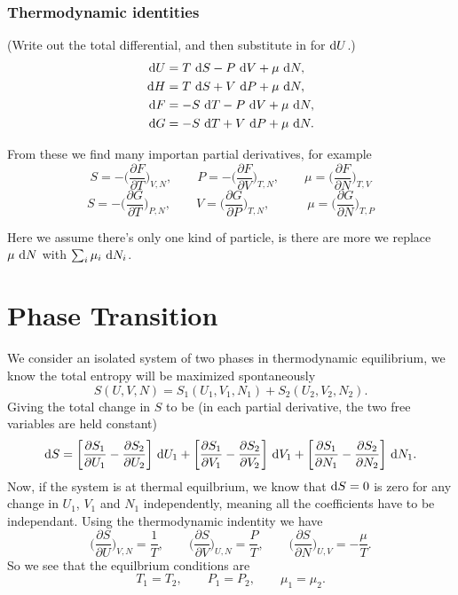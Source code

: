\documentclass[a4paper, 11pt, notitlepage, english]{article}
\renewcommand{\d}{{\rm d}}
\newcommand{\p}{\partial}
\begin{document}
\newpage

\subsubsection*{Thermodynamic identities}
(Write out the total differential, and then substitute in for $\d U$.)
\begin{align*}
\d U &= T\ \d S - P \ \d V + \mu \ \d N, \\
\d H &= T \ \d S + V\ \d P + \mu \ \d N, \\
\d F &=  - S \ \d T - P \ \d V + \mu \ \d N, \\
\d G &= -S \ \d T + V\ \d P + \mu \ \d N.
\end{align*}

From these we find many importan partial derivatives, for example
$$S = -\bigg(\frac{\p F}{\p T}\bigg)_{V, N}, \qquad P = -\bigg(\frac{\p F}{\p V}\bigg)_{T, N}, \qquad \mu = \bigg(\frac{\p F}{\p N}\bigg)_{T,V}$$
$$S = -\bigg(\frac{\p G}{\p T}\bigg)_{P, N}, \qquad V = \bigg(\frac{\p G}{\p P}\bigg)_{T, N}, \qquad\quad \mu = \bigg(\frac{\p G}{\p N}\bigg)_{T,P}$$

Here we assume there's only one kind of particle, is there are more we replace $\mu \ \d N$ with $\sum_i \mu_i \ \d N_i$.


\section{Phase Transition}

We consider an isolated system of two phases in thermodynamic equilibrium, we know the total entropy will be maximized spontaneously
$$S(U,V,N) = S_1(U_1,V_1,N_1) + S_2(U_2,V_2,N_2).$$
Giving the total change in $S$ to be (in each partial derivative, the two free variables are held constant)
$$\d S = \bigg[\frac{\p S_1}{\p U_1} - \frac{\p S_2}{\p U_2}\bigg]\ \d U_1 + \bigg[\frac{\p S_1}{\p V_1} - \frac{\p S_2}{\p V_2}\bigg]\ \d V_1 + \bigg[\frac{\p S_1}{\p N_1} - \frac{\p S_2}{\p N_2}\bigg]\ \d N_1.$$
Now, if the system is at thermal equilbrium, we know that $\d S = 0$ is zero for any change in $U_1$, $V_1$ and $N_1$ independently, meaning all the coefficients have to be independant. Using the thermodynamic indentity we have
$$\bigg(\frac{\p S}{\p U}\bigg)_{V, N} = \frac{1}{T}, \qquad \bigg(\frac{\p S}{\p V}\bigg)_{U, N} = \frac{P}{T}, \qquad \bigg(\frac{\p S}{\p N}\bigg)_{U, V} = -\frac{\mu}{T}.$$
So we see that the equilbrium conditions are
$$T_1 = T_2, \qquad P_1 = P_2, \qquad \mu_1 = \mu_2.$$
\end{document}
